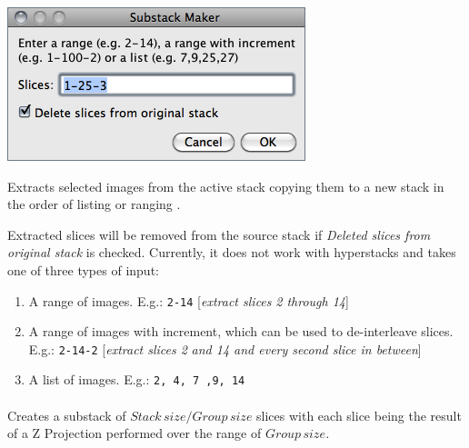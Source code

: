 \begin{minipage}[c][1\totalheight][t]{0.456\columnwidth}%
\includegraphics[scale=0.55]{images/MakeSubstack}%
\end{minipage}%
\begin{minipage}[c][1\totalheight][t]{0.544\columnwidth}%
Extracts selected images from the active stack copying them to a new
stack in the order of listing or ranging \cite{C-SubstackMaker}.

\medskip{}


Extracted slices will be removed from the source stack if \emph{Deleted
slices from original stack} is checked. Currently, it does not work
with hyperstacks and takes one of three types of input:%
\end{minipage}
\begin{enumerate}
\item A range of images. E.g.: \texttt{2-14} {[}\emph{extract slices} \emph{2
through 14}{]}
\item A range of images with increment, which can be used to de-interleave
slices. E.g.: \texttt{2-14-2} {[}\emph{extract slices 2} \emph{and
14 and every second slice in between}{]}
\item A list of images. E.g.: \texttt{2,\,4,\,7\,,9,\,14}
\end{enumerate}



\paragraph[\protect\userinterface{Grouped Z Project\ldots{}}]{\protect{}\label{par:Grouped-Z-Project}\improvement{}}

Creates
a substack of $Stack\, size/Group\, size$ slices with each slice
being the result of a Z Projection performed over the range of $Group\, size$\emph{.}

